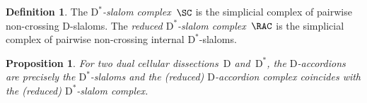 \documentclass{amsart}
\newtheorem{proposition}[theorem]{Proposition}
\theoremstyle{definition}
\newtheorem{definition}[theorem]{Definition}
\newtheorem{remark}[theorem]{Remark}
\newcommand{\darkblue}{\color{darkblue}} %
\newcommand{\defn}[1]{\textsl{\darkblue #1}} %
\newcommand{\dual}{^*} %
\newcommand{\dissection}{\mathrm{D}} %
\begin{document}
\begin{definition}
\label{def:slalomComplex}
The \defn{$\dissection\dual$-slalom complex}~$\SC$ is the simplicial complex of pairwise non-crossing $\dissection$-slaloms.
The \defn{reduced $\dissection\dual$-slalom complex}~$\RAC$ is the simplicial complex of pairwise non-crossing internal $\dissection\dual$-slaloms.
\end{definition}


\begin{proposition}
\label{prop:accordionsSlaloms}
For two dual cellular dissections~$\dissection$ and~$\dissection\dual$, the $\dissection$-accordions are precisely the $\dissection\dual$-slaloms and the (reduced) $\dissection$-accordion complex coincides with the (reduced) $\dissection\dual$-slalom complex.
\end{proposition}
\end{document}
